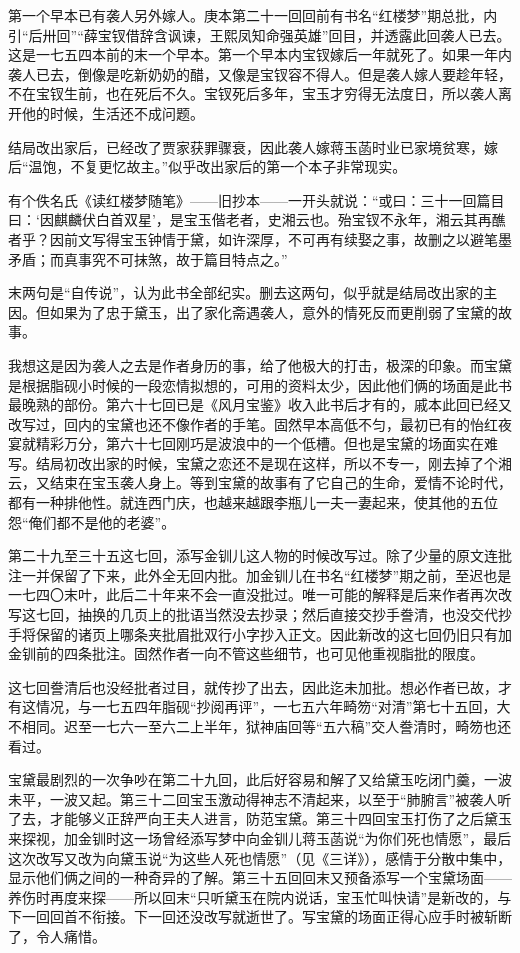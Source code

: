 \par 第一个早本已有袭人另外嫁人。庚本第二十一回回前有书名“红楼梦”期总批，内引“后卅回”“薛宝钗借辞含讽谏，王熙凤知命强英雄”回目，并透露此回袭人已去。这是一七五四本前的末一个早本。第一个早本内宝钗嫁后一年就死了。如果一年内袭人已去，倒像是吃新奶奶的醋，又像是宝钗容不得人。但是袭人嫁人要趁年轻，不在宝钗生前，也在死后不久。宝钗死后多年，宝玉才穷得无法度日，所以袭人离开他的时候，生活还不成问题。
\par 结局改出家后，已经改了贾家获罪骤衰，因此袭人嫁蒋玉菡时业已家境贫寒，嫁后“温饱，不复更忆故主。”似乎改出家后的第一个本子非常现实。
\par 有个佚名氏《读红楼梦随笔》——旧抄本——一开头就说：“或曰：三十一回篇目曰：‘因麒麟伏白首双星’，是宝玉偕老者，史湘云也。殆宝钗不永年，湘云其再醮者乎？因前文写得宝玉钟情于黛，如许深厚，不可再有续娶之事，故删之以避笔墨矛盾；而真事究不可抹煞，故于篇目特点之。”
\par 末两句是“自传说”，认为此书全部纪实。删去这两句，似乎就是结局改出家的主因。但如果为了忠于黛玉，出了家化斋遇袭人，意外的情死反而更削弱了宝黛的故事。
\par 我想这是因为袭人之去是作者身历的事，给了他极大的打击，极深的印象。而宝黛是根据脂砚小时候的一段恋情拟想的，可用的资料太少，因此他们俩的场面是此书最晚熟的部份。第六十七回已是《风月宝鉴》收入此书后才有的，戚本此回已经又改写过，回内的宝黛也还不像作者的手笔。固然早本高低不匀，最初已有的怡红夜宴就精彩万分，第六十七回刚巧是波浪中的一个低槽。但也是宝黛的场面实在难写。结局初改出家的时候，宝黛之恋还不是现在这样，所以不专一，刚去掉了个湘云，又结束在宝玉袭人身上。等到宝黛的故事有了它自己的生命，爱情不论时代，都有一种排他性。就连西门庆，也越来越跟李瓶儿一夫一妻起来，使其他的五位怨“俺们都不是他的老婆”。
\par 第二十九至三十五这七回，添写金钏儿这人物的时候改写过。除了少量的原文连批注一并保留了下来，此外全无回内批。加金钏儿在书名“红楼梦”期之前，至迟也是一七四〇末叶，此后二十年来不会一直没批过。唯一可能的解释是后来作者再次改写这七回，抽换的几页上的批语当然没去抄录；然后直接交抄手誊清，也没交代抄手将保留的诸页上哪条夹批眉批双行小字抄入正文。因此新改的这七回仍旧只有加金钏前的四条批注。固然作者一向不管这些细节，也可见他重视脂批的限度。
\par 这七回誊清后也没经批者过目，就传抄了出去，因此迄未加批。想必作者已故，才有这情况，与一七五四年脂砚“抄阅再评”，一七五六年畸笏“对清”第七十五回，大不相同。迟至一七六一至六二上半年，狱神庙回等“五六稿”交人誊清时，畸笏也还看过。
\par 宝黛最剧烈的一次争吵在第二十九回，此后好容易和解了又给黛玉吃闭门羹，一波未平，一波又起。第三十二回宝玉激动得神志不清起来，以至于“肺腑言”被袭人听了去，才能够义正辞严向王夫人进言，防范宝黛。第三十四回宝玉打伤了之后黛玉来探视，加金钏时这一场曾经添写梦中向金钏儿蒋玉菡说“为你们死也情愿”，最后这次改写又改为向黛玉说“为这些人死也情愿”（见《三详》），感情于分散中集中，显示他们俩之间的一种奇异的了解。第三十五回回末又预备添写一个宝黛场面——养伤时再度来探——所以回末“只听黛玉在院内说话，宝玉忙叫快请”是新改的，与下一回回首不衔接。下一回还没改写就逝世了。写宝黛的场面正得心应手时被斩断了，令人痛惜。
